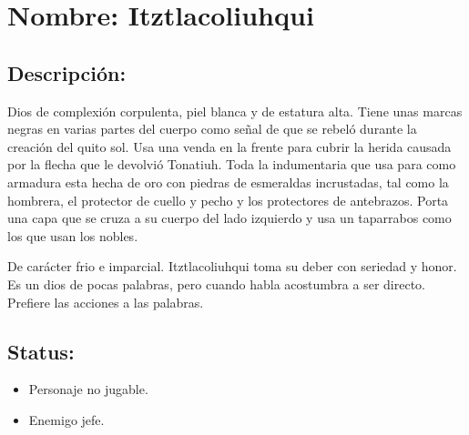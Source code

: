 \section{Nombre: Itztlacoliuhqui}  \label{per:itztlacoliuhqui}

\subsection{Descripción:}
Dios de complexión corpulenta, piel blanca y de estatura alta. Tiene unas marcas negras en varias partes del cuerpo como señal de que se rebeló durante la creación del quito sol. Usa una venda en la frente para cubrir la herida causada por la flecha que le devolvió Tonatiuh. Toda la indumentaria que usa para como armadura esta hecha de oro con piedras de esmeraldas incrustadas, tal como la hombrera, el protector de cuello y pecho y los protectores de antebrazos. Porta una capa que se cruza a su cuerpo del lado izquierdo y usa un taparrabos como los que usan los nobles.
\\
\par
De carácter frio e imparcial. Itztlacoliuhqui toma su deber con seriedad y honor. Es un dios de pocas palabras, pero cuando habla acostumbra a ser directo. Prefiere las acciones a las palabras. 
\subsection{Status:}
	\begin{itemize}
		\item Personaje no jugable.
		\item Enemigo jefe.
	\end{itemize}	  
